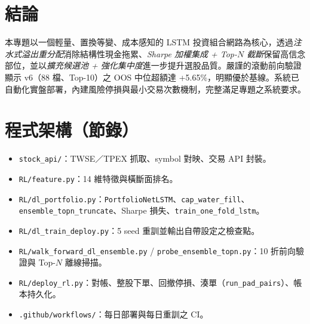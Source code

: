 \documentclass[11pt, fontset=none]{ctexart}
\begin{document}
\section{結論}
本專題以一個輕量、置換等變、成本感知的 LSTM 投資組合網路為核心，透過\emph{注水式溢出重分配}消除結構性現金拖累、\emph{Sharpe 加權集成 + Top-$N$ 截斷}保留高信念部位，並以\emph{擴充候選池 + 強化集中度}進一步提升選股品質。嚴謹的滾動前向驗證顯示 v6（88 檔、Top-10）之 OOS 中位超額達 +5.65\%，明顯優於基線。系統已自動化實盤部署，內建風險停損與最小交易次數機制，完整滿足專題之系統要求。

\appendix
\section{程式架構（節錄）}
\begin{itemize}[leftmargin=2em]
  \item \texttt{stock\_api/}：TWSE／TPEX 抓取、symbol 對映、交易 API 封裝。
  \item \texttt{RL/feature.py}：14 維特徵與橫斷面排名。
  \item \texttt{RL/dl\_portfolio.py}：\texttt{PortfolioNetLSTM}、\texttt{cap\_water\_fill}、\texttt{ensemble\_topn\_truncate}、Sharpe 損失、\texttt{train\_one\_fold\_lstm}。
  \item \texttt{RL/dl\_train\_deploy.py}：5 seed 重訓並輸出自帶設定之檢查點。
  \item \texttt{RL/walk\_forward\_dl\_ensemble.py} / \texttt{probe\_ensemble\_topn.py}：10 折前向驗證與 Top-$N$ 離線掃描。
  \item \texttt{RL/deploy\_rl.py}：對帳、整股下單、回撤停損、湊單（\texttt{run\_pad\_pairs}）、帳本持久化。
  \item \texttt{.github/workflows/}：每日部署與每日重訓之 CI。
\end{itemize}
\end{document}
